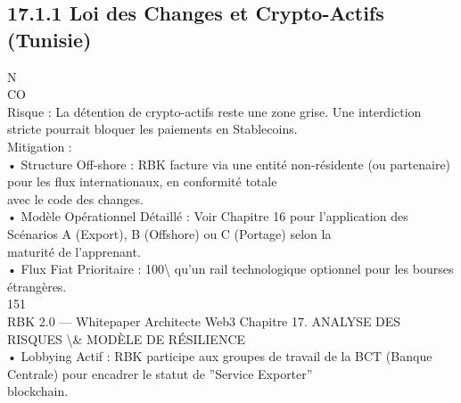 \documentclass[12pt,landscape,a4paper]{article}
\begin{document}
\subsection{17.1.1 Loi des Changes et Crypto-Actifs (Tunisie)}
N\\
CO\\
Risque : La détention de crypto-actifs reste une zone grise. Une interdiction stricte pourrait bloquer les paiements en Stablecoins.\\
Mitigation :\\
\vspace{0.5em}
• Structure Off-shore : RBK facture via une entité non-résidente (ou partenaire) pour les flux internationaux, en conformité totale\\
avec le code des changes.\\
\vspace{0.5em}
• Modèle Opérationnel Détaillé : Voir Chapitre 16 pour l’application des Scénarios A (Export), B (Offshore) ou C (Portage) selon la\\
maturité de l’apprenant.\\
\vspace{0.5em}
• Flux Fiat Prioritaire : 100\textbackslash{}%
qu’un rail technologique optionnel pour les bourses étrangères.\\
\vspace{0.5em}
\vspace{0.5em}
151\\
RBK 2.0 — Whitepaper Architecte Web3                                        Chapitre 17. ANALYSE DES RISQUES \textbackslash{}& MODÈLE DE RÉSILIENCE\\
\vspace{0.5em}
\vspace{0.5em}
• Lobbying Actif : RBK participe aux groupes de travail de la BCT (Banque Centrale) pour encadrer le statut de ”Service Exporter”\\
blockchain.\\
\vspace{0.5em}
\vspace{0.5em}
\end{document}
